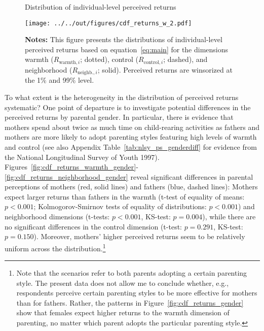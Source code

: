 \documentclass[12pt, a4paper, english]{article}
\begin{document}
\begin{figure}[h!]\centering
    \caption{Distribution of individual-level perceived returns}\label{fig:cdf_returns}
    \texttt{[image: ../../out/figures/cdf\_returns\_w\_2.pdf]} 
    \caption*{\footnotesize \textbf{Notes:} This figure presents the distributions of individual-level perceived returns based on equation~\eqref{eq:main} for the dimensions warmth ($R_{\text{warmth},i}$; dotted), control ($R_{\text{control},i}$; dashed), and neighborhood ($R_{\text{neighb.},i}$; solid). Perceived returns are winsorized at the 1\% and 99\% level.}
\end{figure}

To what extent is the heterogeneity in the distribution of perceived returns systematic? One point of departure is to investigate potential differences in the perceived returns by parental gender. In particular, there is evidence that mothers spend about twice as much time on child-rearing activities as fathers \citep{Guryanetal2008} and mothers are more likely to adopt parenting styles featuring high levels of warmth and control (see also Appendix Table~\ref{tab:nlsy_ps_genderdiff} for evidence from the National Longitudinal Survey of Youth 1997). Figures~\ref{fig:cdf_returns_warmth_gender}-\ref{fig:cdf_returns_neighborhood_gender} reveal significant differences in parental perceptions of mothers (red, solid lines) and fathers (blue, dashed lines): Mothers expect larger returns than fathers in the warmth (t-test of equality of means: $p<0.001$; Kolmogorov-Smirnov tests of equality of distributions: $p<0.001$) and neighborhood dimensions (t-tests: $p<0.001$, KS-test: $p=0.004$), while there are no significant differences in the control dimension (t-test: $p=0.291$, KS-test: $p=0.150$). Moreover, mothers' higher perceived returns seem to be relatively uniform across the distribution.\footnote{Note that the scenarios refer to both parents adopting a certain parenting style. The present data does not allow me to conclude whether, e.g., respondents perceive certain parenting styles to be more effective for mothers than for fathers. Rather, the patterns in Figure~\ref{fig:cdf_returns_gender} show that females expect higher returns to the warmth dimension of parenting, no matter which parent adopts the particular parenting style.}
\end{document}
